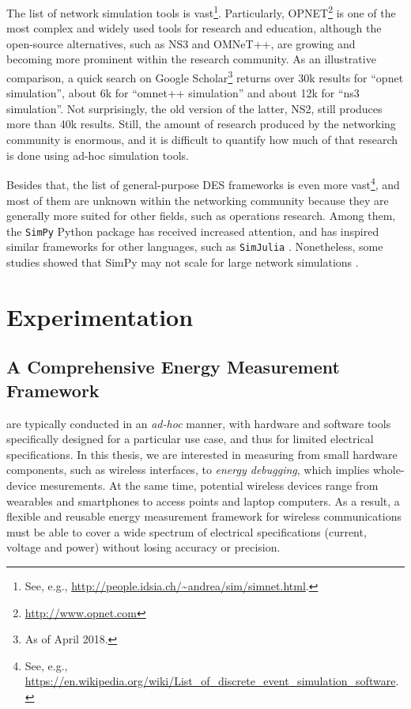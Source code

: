 \documentclass[twoside,nohyper]{tufte-book}
\newcommand{\partseparator}{
  \noindent\leavevmode\leaders\hrule height 0.8ex depth \dimexpr0.4pt-0.8ex\hfill\kern0pt
  \newline~\vspace{-0.5\baselineskip}\newline}
\begin{document}
The list of network simulation tools is vast\footnote{See, e.g., \url{http://people.idsia.ch/~andrea/sim/simnet.html}.}. Particularly, OPNET\footnote{\url{http://www.opnet.com}} is one of the most complex and widely used tools for research and education, although the open-source alternatives, such as NS3 and OMNeT++, are growing and becoming more prominent within the research community. As an illustrative comparison, a quick search on Google Scholar\footnote{As of April 2018.} returns over 30k results for ``opnet simulation'', about 6k for ``omnet++ simulation'' and about 12k for ``ns3 simulation''. Not surprisingly, the old version of the latter, NS2, still produces more than 40k results. Still, the amount of research produced by the networking community is enormous, and it is difficult to quantify how much of that research is done using ad-hoc simulation tools.

Besides that, the list of general-purpose DES frameworks is even more vast\footnote{See, e.g., \url{https://en.wikipedia.org/wiki/List_of_discrete_event_simulation_software}.}, and most of them are unknown within the networking community because they are generally more suited for other fields, such as operations research. Among them, the \texttt{SimPy} Python package\cite[0pt]{SimPy} has received increased attention, and has inspired similar frameworks for other languages, such as \texttt{SimJulia} \citep{GitHub:SimJulia}. Nonetheless, some studies showed that SimPy may not scale for large network simulations \citep[\citet{weingartner2009}]{bahouth2007}.

\addtocontents{toc}{\partseparator}

\hypertarget{part-experimentation}{%
\part{Experimentation}\label{part-experimentation}}

\hypertarget{ch:03}{%
\chapter{A Comprehensive Energy Measurement Framework}\label{ch:03}}

 are typically conducted in an \emph{ad-hoc} manner, with hardware and software tools specifically designed for a particular use case, and thus for limited electrical specifications. In this thesis, we are interested in measuring from small hardware components, such as wireless interfaces, to \emph{energy debugging}\cite[0pt]{Pathak2011}, which implies whole-device mesurements. At the same time, potential wireless devices range from wearables and smartphones to access points and laptop computers. As a result, a flexible and reusable energy measurement framework for wireless communications must be able to cover a wide spectrum of electrical specifications (current, voltage and power) without losing accuracy or precision.
\end{document}
